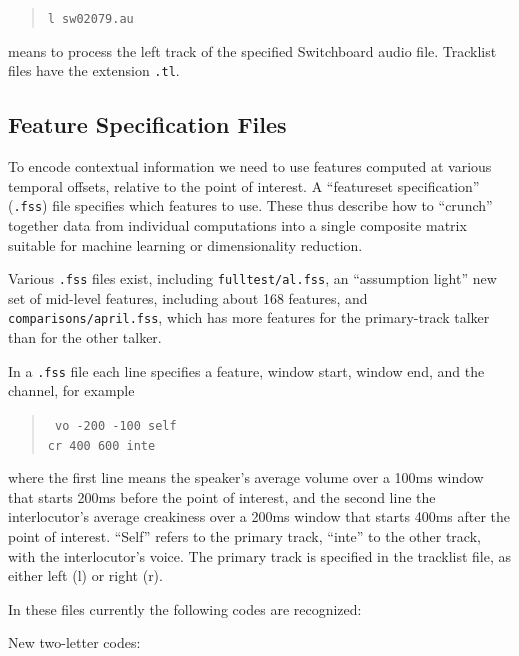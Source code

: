 \documentclass[11pt]{article}
\begin{document}
\begin{quote}
\verb+l sw02079.au+
\end{quote}

means to process the left track of the specified Switchboard audio
file.  Tracklist files have the extension {\tt .tl}. 


\subsection{Feature Specification Files}     \label{featurespec-files}

To encode contextual information we need to use features computed at
various temporal offsets, relative to the point of interest.  A
``featureset specification'' ({\tt .fss}) file specifies which
features to use.  These thus describe how to ``crunch'' together data
from individual computations into a single composite matrix suitable
for machine learning or dimensionality reduction.

Various {\tt .fss} files exist, including {\tt fulltest/al.fss}, an
``assumption light'' new set of mid-level features, including about
168 features, and {\tt comparisons/april.fss}, which has more features
for the primary-track talker than for the other talker. 


In a {\tt .fss} file each line specifies a feature, window start,
window end, and the channel, for example

\begin{quote}{\tt 
    vo   -200   -100 self  \\
    cr    400    600 inte
}\end{quote}

where the first line means the speaker's average volume over a 100ms
window that starts 200ms before the point of interest, and the second
line the interlocutor's average creakiness over a 200ms window that
starts 400ms after the point of interest.  ``Self'' refers to the
primary track, ``inte'' to the other track, with the interlocutor's
voice.  The primary track is  specified in the
tracklist file, as either left (l) or right (r).


In these files currently the following codes are recognized:

New two-letter codes: 
\end{document}
